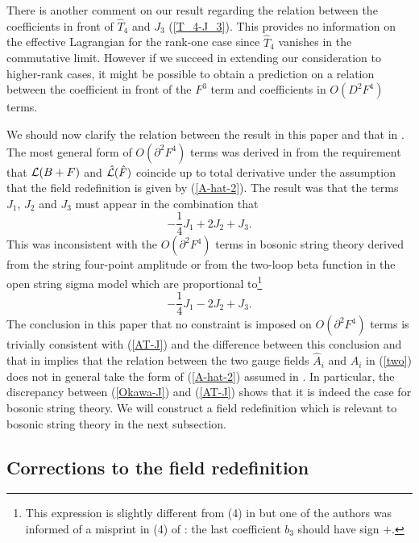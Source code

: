 \documentclass[a4paper,12pt]{article}
\begin{document}
There is another comment on our result regarding
the relation between the coefficients in front of
$\hat{T}_4$ and $J_3$ (\ref{T_4-J_3}).
This provides no information on the effective Lagrangian
for the rank-one case since $\hat{T}_4$ vanishes
in the commutative limit.
However if we succeed in extending our consideration
to higher-rank cases, it might be possible to obtain
a prediction on a relation between the coefficient in front of
the $F^3$ term and coefficients in $O(D^2 F^4)$ terms.

We should now clarify the relation between the result in this paper
and that in \cite{Okawa}.
The most general form of $O(\partial^2 F^4)$ terms
was derived in \cite{Okawa} from the requirement that
${\cal L} (B+F)$ and $\hat{{\cal L}} (\hat{F})$ coincide
up to total derivative under the assumption that
the field redefinition is given by (\ref{A-hat-2}).
The result was that the terms $J_1$, $J_2$ and $J_3$ must appear
in the combination that
\begin{equation}
-\frac{1}{4} J_1 +2 J_2 + J_3.
\label{Okawa-J}
\end{equation}
This was inconsistent with
the $O(\partial^2 F^4)$ terms
in bosonic string theory derived from the string four-point
amplitude \cite{AT1} or from
the two-loop beta function
in the open string sigma model \cite{AT2}
which are proportional to\footnote{
This expression is slightly different from
(4) in \cite{AT2} but one of
the authors was informed of
a misprint in (4) of \cite{AT2}:
the last coefficient $b_3$ should have sign $+$.
}
\begin{equation}
-\frac{1}{4} J_1 -2 J_2 + J_3.
\label{AT-J}
\end{equation}
The conclusion in this paper that no constraint is imposed
on $O(\partial^2 F^4)$ terms
is trivially consistent with (\ref{AT-J})
and the difference between this conclusion
and that in \cite{Okawa} implies that
the relation between
the two gauge fields $\hat{A}_i$ and $A_i$ in (\ref{two})
does not in general take the form of (\ref{A-hat-2})
assumed in \cite{Okawa}.
In particular, the discrepancy
between (\ref{Okawa-J}) and (\ref{AT-J})
shows that it is indeed the case for bosonic string theory.
We will construct a field redefinition which is relevant
to bosonic string theory in the next subsection.

\subsection{Corrections to the field redefinition}
\indent
\end{document}
